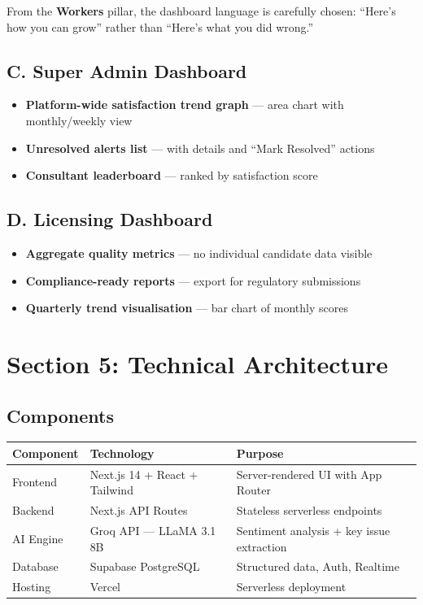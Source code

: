 \documentclass[11pt, a4paper]{article}
\begin{document}
From the \textbf{Workers} pillar, the dashboard language is carefully chosen: ``Here's how you can grow'' rather than ``Here's what you did wrong.''

\subsection{C. Super Admin Dashboard}

\begin{itemize}[leftmargin=2em]
\item \textbf{Platform-wide satisfaction trend graph} — area chart with monthly/weekly view
\item \textbf{Unresolved alerts list} — with details and ``Mark Resolved'' actions
\item \textbf{Consultant leaderboard} — ranked by satisfaction score
\end{itemize}

\subsection{D. Licensing Dashboard}

\begin{itemize}[leftmargin=2em]
\item \textbf{Aggregate quality metrics} — no individual candidate data visible
\item \textbf{Compliance-ready reports} — export for regulatory submissions
\item \textbf{Quarterly trend visualisation} — bar chart of monthly scores
\end{itemize}

\section{Section 5: Technical Architecture}

\subsection{Components}

\begin{tabularx}{\textwidth}{l l X}
\toprule
\textbf{Component} & \textbf{Technology} & \textbf{Purpose} \\
\midrule
Frontend & Next.js 14 + React + Tailwind & Server-rendered UI with App Router \\
Backend & Next.js API Routes & Stateless serverless endpoints \\
AI Engine & Groq API — LLaMA 3.1 8B & Sentiment analysis + key issue extraction \\
Database & Supabase PostgreSQL & Structured data, Auth, Realtime \\
Hosting & Vercel & Serverless deployment \\
\bottomrule
\end{tabularx}
\end{document}
